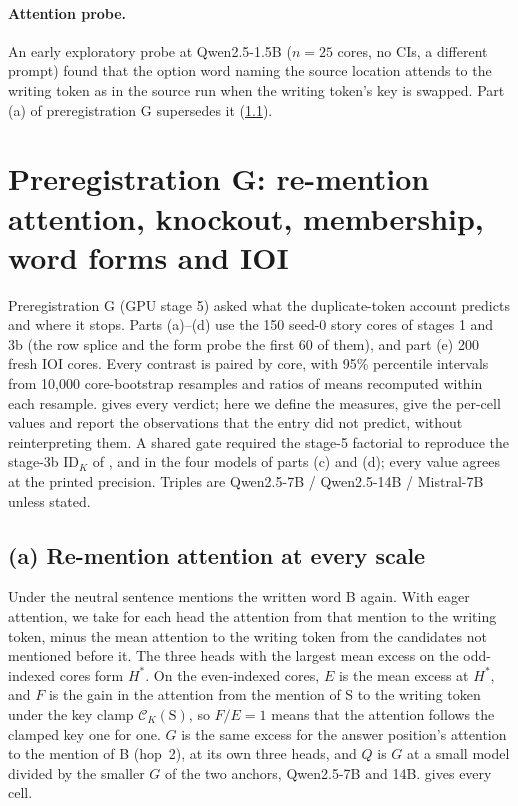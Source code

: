 \paragraph{Attention probe.} An early exploratory probe at Qwen2.5-1.5B ($n = 25$ cores, no CIs, a different prompt) found that the option word naming the source location attends to the writing token as in the source run when the writing token's key is swapped. Part (a) of preregistration G supersedes it (\cref{app:g-attention}).

\clearpage
\section{Preregistration G: re-mention attention, knockout, membership, word forms and IOI}\label{app:stage5}

Preregistration G (GPU stage 5) asked what the duplicate-token account predicts and where it stops. Parts (a)--(d) use the 150 seed-0 story cores of stages 1 and 3b (the row splice and the form probe the first 60 of them), and part (e) 200 fresh IOI cores. Every contrast is paired by core, with 95\% percentile intervals from 10{,}000 core-bootstrap resamples and ratios of means recomputed within each resample.  gives every verdict; here we define the measures, give the per-cell values and report the observations that the entry did not predict, without reinterpreting them. A shared gate required the stage-5 factorial to reproduce the stage-3b $\mathrm{ID}_K$ of \fmtPost{}, \fmtNone{} and \fmtListA{} in the four models of parts (c) and (d); every value agrees at the printed precision. Triples are Qwen2.5-7B / Qwen2.5-14B / Mistral-7B unless stated.

\subsection{(a) Re-mention attention at every scale}\label{app:g-attention}

Under \fmtPost{} the neutral sentence mentions the written word B again. With eager attention, we take for each head the attention from that mention to the writing token, minus the mean attention to the writing token from the candidates not mentioned before it. The three heads with the largest mean excess on the odd-indexed cores form $H^*$. On the even-indexed cores, $E$ is the mean excess at $H^*$, and $F$ is the gain in the attention from the mention of S to the writing token under the key clamp $\mathcal{C}_K(\mathrm{S})$, so $F/E = 1$ means that the attention follows the clamped key one for one. $G$ is the same excess for the answer position's attention to the mention of B (hop~2), at its own three heads, and $Q$ is $G$ at a small model divided by the smaller $G$ of the two anchors, Qwen2.5-7B and 14B.  gives every cell.


